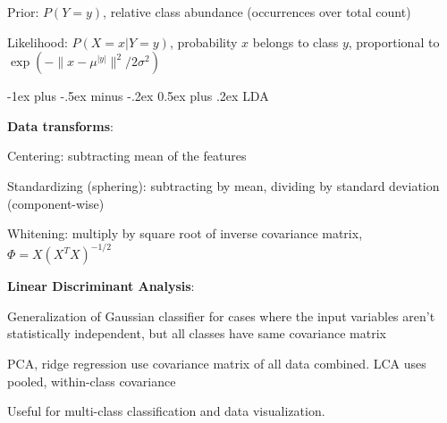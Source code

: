 \documentclass[10pt,landscape]{article}
\makeatletter
\renewcommand{\section}{\@startsection{section}{1}{0mm}%
                                {-1ex plus -.5ex minus -.2ex}%
                                {0.5ex plus .2ex}%
                                {\normalfont\large\bfseries}}
\makeatother
\begin{document}
\begin{multicols}{3}
Prior: $P(Y=y)$, relative class abundance (occurrences over total count)

Likelihood: $P(X=x|Y=y)$, probability $x$ belongs to class $y$, proportional to $\exp(-\lVert x - \mu^{|y|} \rVert^2 / 2\sigma^2)$

\section{LDA}

\textbf{Data transforms}:

Centering: subtracting mean of the features

Standardizing (sphering): subtracting by mean, dividing by standard deviation (component-wise)

Whitening: multiply by square root of inverse covariance matrix, $\Phi = X(X^T X)^{-1/2}$

\textbf{Linear Discriminant Analysis}:

Generalization of Gaussian classifier for cases where the input variables aren't statistically independent, but all classes have same covariance matrix

PCA, ridge regression use covariance matrix of all data combined. LCA uses pooled, within-class covariance

Useful for multi-class classification and data visualization. 


\end{multicols}
\end{document}
